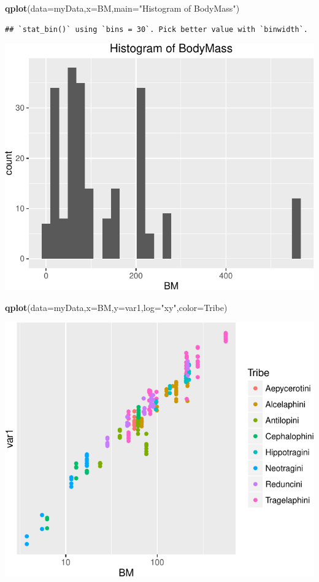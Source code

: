 \documentclass[]{article}
\newenvironment{Shaded}{\begin{snugshade}}{\end{snugshade}}
\newcommand{\KeywordTok}[1]{\textcolor[rgb]{0.13,0.29,0.53}{\textbf{{#1}}}}
\newcommand{\DataTypeTok}[1]{\textcolor[rgb]{0.13,0.29,0.53}{{#1}}}
\newcommand{\StringTok}[1]{\textcolor[rgb]{0.31,0.60,0.02}{{#1}}}
\newcommand{\NormalTok}[1]{{#1}}
\numberwithin{equation}{section}
\begin{document}
\begin{Shaded}
\begin{Highlighting}[]
\KeywordTok{qplot}\NormalTok{(}\DataTypeTok{data=}\NormalTok{myData,}\DataTypeTok{x=}\NormalTok{BM,}\DataTypeTok{main=}\StringTok{"Histogram of BodyMass"}\NormalTok{)}
\end{Highlighting}
\end{Shaded}

\begin{verbatim}
## `stat_bin()` using `bins = 30`. Pick better value with `binwidth`.
\end{verbatim}

\includegraphics{index_files/figure-latex/unnamed-chunk-236-1.pdf}

\begin{Shaded}
\begin{Highlighting}[]
\KeywordTok{qplot}\NormalTok{(}\DataTypeTok{data=}\NormalTok{myData,}\DataTypeTok{x=}\NormalTok{BM,}\DataTypeTok{y=}\NormalTok{var1,}\DataTypeTok{log=}\StringTok{"xy"}\NormalTok{,}\DataTypeTok{color=}\NormalTok{Tribe)}
\end{Highlighting}
\end{Shaded}

\includegraphics{index_files/figure-latex/unnamed-chunk-236-2.pdf}
\end{document}
